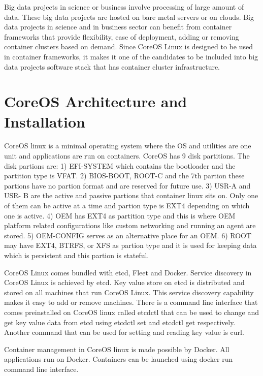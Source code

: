 \documentclass[9pt,twocolumn,twoside]{styles/osajnl}
\begin{document}
Big data projects in science or business involve processing of large
amount of data.  These big data projects are hosted on bare metal
servers or on clouds. Big data projects in science and in business
sector can benefit from container frameworks that provide flexibility,
ease of deployment, adding or removing container clusters based on
demand. \cite{julian2016containers} Since CoreOS Linux is designed to
be used in container frameworks, it makes it one of the candidates to
be included into big data projects software stack that has container
cluster infrastructure.

\section{CoreOS Architecture and Installation}

CoreOS linux is a minimal operating system where the OS and utilities
are one unit and applications are run on containers. CoreOS has 9 disk
partitions. The disk partions are: 1) EFI-SYSTEM which contains the
bootloader and the partition type is VFAT. 2) BIOS-BOOT, ROOT-C and
the 7th partion these partions have no partion format and are reserved
for future use. 3) USR-A and USR- B are the active and passive
partions that container linux sits on. Only one of them can be active
at a time and partion type is EXT4 depending on which one is
active. 4) OEM has EXT4 as partition type and this is where OEM
platform related configurations like custom networking and running an
agent are stored. 5) OEM-CONFIG serves as an alternative place for an
OEM. 6) ROOT may have EXT4, BTRFS, or XFS as partion type and it is
used for keeping data which is persistent and this partion is
stateful. \cite{www-core}

CoreOS Linux comes bundled with etcd, Fleet and Docker. Service
discovery in CoreOS Linux is achieved by etcd. Key value store on etcd
is distributed and stored on all machines that run CoreOS Linux. This
service discovery capability makes it easy to add or remove
machines. There is a command line interface that comes preinstalled on
CoreOS linux called etcdctl that can be used to change and get key
value data from etcd using etcdctl set and etcdctl get
respectively. Another command that can be used for setting and reading key
value is curl.

Container management in CoreOS linux is made possible by Docker.  All
applications run on Docker. Containers can be launched using docker
run command line interface.
\end{document}
